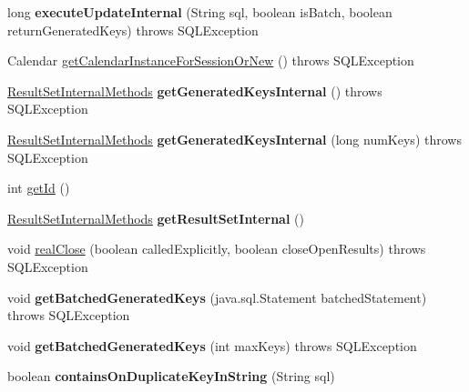 \begin{DoxyCompactItemize}
long {\bfseries execute\+Update\+Internal} (String sql, boolean is\+Batch, boolean return\+Generated\+Keys)  throws S\+Q\+L\+Exception 
\item 
Calendar \mbox{\hyperlink{classcom_1_1mysql_1_1jdbc_1_1_statement_impl_a687b9b26a0936a0d3c1e7466e2e2ffc2}{get\+Calendar\+Instance\+For\+Session\+Or\+New}} ()  throws S\+Q\+L\+Exception 
\item 
\mbox{\label{classcom_1_1mysql_1_1jdbc_1_1_statement_impl_a5c74e75454e2010bb262d7b855eeb15e}} 
\mbox{\hyperlink{interfacecom_1_1mysql_1_1jdbc_1_1_result_set_internal_methods}{Result\+Set\+Internal\+Methods}} {\bfseries get\+Generated\+Keys\+Internal} ()  throws S\+Q\+L\+Exception 
\item 
\mbox{\label{classcom_1_1mysql_1_1jdbc_1_1_statement_impl_abad047a4c33ef26599e109c1eab3ff4c}} 
\mbox{\hyperlink{interfacecom_1_1mysql_1_1jdbc_1_1_result_set_internal_methods}{Result\+Set\+Internal\+Methods}} {\bfseries get\+Generated\+Keys\+Internal} (long num\+Keys)  throws S\+Q\+L\+Exception 
\item 
int \mbox{\hyperlink{classcom_1_1mysql_1_1jdbc_1_1_statement_impl_a948e2b7dd749359c3babde0c6d9acb2a}{get\+Id}} ()
\item 
\mbox{\label{classcom_1_1mysql_1_1jdbc_1_1_statement_impl_a9c7096ccd81eae394132047b6c35efb4}} 
\mbox{\hyperlink{interfacecom_1_1mysql_1_1jdbc_1_1_result_set_internal_methods}{Result\+Set\+Internal\+Methods}} {\bfseries get\+Result\+Set\+Internal} ()
\item 
void \mbox{\hyperlink{classcom_1_1mysql_1_1jdbc_1_1_statement_impl_a1e0670e4c9378bf2790c688208dc8913}{real\+Close}} (boolean called\+Explicitly, boolean close\+Open\+Results)  throws S\+Q\+L\+Exception 
\item 
\mbox{\label{classcom_1_1mysql_1_1jdbc_1_1_statement_impl_ac1f47f795a383bd5826cbde773b2b4bb}} 
void {\bfseries get\+Batched\+Generated\+Keys} (java.\+sql.\+Statement batched\+Statement)  throws S\+Q\+L\+Exception 
\item 
\mbox{\label{classcom_1_1mysql_1_1jdbc_1_1_statement_impl_a5d7ce55d6837f2517de2b9c410a3a55b}} 
void {\bfseries get\+Batched\+Generated\+Keys} (int max\+Keys)  throws S\+Q\+L\+Exception 
\item 
\mbox{\label{classcom_1_1mysql_1_1jdbc_1_1_statement_impl_a6fd6d183a9cc7a38a3ef9704d8fcdc56}} 
boolean {\bfseries contains\+On\+Duplicate\+Key\+In\+String} (String sql)
\end{DoxyCompactItemize}
